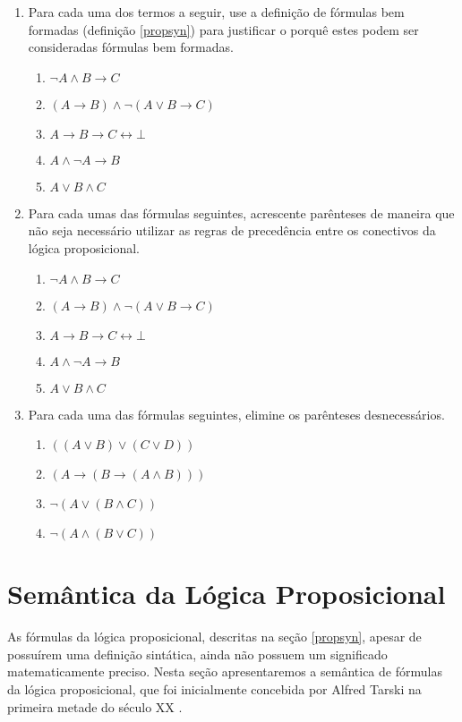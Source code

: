 \begin{enumerate}
  \item Para cada uma dos termos a seguir, use a defini\c{c}\~ao
    de f\'ormulas bem formadas (defini\c{c}\~ao \ref{propsyn}) para
    justificar o porqu\^e estes podem ser consideradas f\'ormulas bem
    formadas.
   \begin{enumerate}
       \item $\neg A \land B \to C$
       \item $(A \to B) \land \neg (A \lor B \to C)$
       \item $A \to B \to C \leftrightarrow \bot$
       \item $A \land \neg A \to B$
       \item $A \lor B \land C$
   \end{enumerate}
   \item Para cada umas das f\'ormulas seguintes, acrescente
     par\^enteses de maneira que n\~ao seja necess\'ario utilizar as
     regras de preced\^encia entre os conectivos da l\'ogica proposicional.
   \begin{enumerate}
       \item $\neg A \land B \to C$
       \item $(A \to B) \land \neg (A \lor B \to C)$
       \item $A \to B \to C \leftrightarrow \bot$
       \item $A \land \neg A \to B$
       \item $A \lor B \land C$
   \end{enumerate}
   \item Para cada uma das f\'ormulas seguintes, elimine os par\^enteses
   desnecess\'arios.
  \begin{enumerate}
	\item $((A\lor B)\lor (C\lor D))$
	\item $(A\rightarrow (B\rightarrow (A\land B)))$
	\item $\neg(A \lor (B\land C))$
	\item $\neg(A \land (B\lor C))$
  \end{enumerate}
\end{enumerate}

\section{Sem\^antica da L\'ogica Proposicional}\label{propsem}

As f\'ormulas da l\'ogica proposicional, descritas na se\c{c}\~ao
\ref{propsyn}, apesar de possu\'irem uma defini\c{c}\~ao sint\'atica,
ainda n\~ao possuem um significado matematicamente preciso. Nesta
se\c{c}\~ao apresentaremos a sem\^antica de f\'ormulas da l\'ogica
proposicional, que foi inicialmente concebida por Alfred Tarski na
primeira metade do s\'eculo XX \cite{halmos57}.

